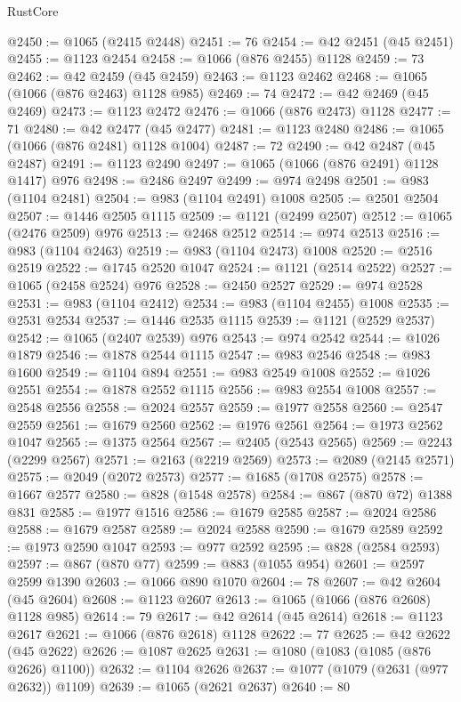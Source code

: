 \begin{lexlean}{RustCore}
\begin{coremodule}
@2450 := @1065 (@2415 @2448)
@2451 := 76
@2454 := @42 @2451 (@45 @2451)
@2455 := @1123 @2454
@2458 := @1066 (@876 @2455) @1128
@2459 := 73
@2462 := @42 @2459 (@45 @2459)
@2463 := @1123 @2462
@2468 := @1065 (@1066 (@876 @2463) @1128 @985)
@2469 := 74
@2472 := @42 @2469 (@45 @2469)
@2473 := @1123 @2472
@2476 := @1066 (@876 @2473) @1128
@2477 := 71
@2480 := @42 @2477 (@45 @2477)
@2481 := @1123 @2480
@2486 := @1065 (@1066 (@876 @2481) @1128 @1004)
@2487 := 72
@2490 := @42 @2487 (@45 @2487)
@2491 := @1123 @2490
@2497 := @1065 (@1066 (@876 @2491) @1128 @1417) @976
@2498 := @2486 @2497
@2499 := @974 @2498
@2501 := @983 (@1104 @2481)
@2504 := @983 (@1104 @2491) @1008
@2505 := @2501 @2504
@2507 := @1446 @2505 @1115
@2509 := @1121 (@2499 @2507)
@2512 := @1065 (@2476 @2509) @976
@2513 := @2468 @2512
@2514 := @974 @2513
@2516 := @983 (@1104 @2463)
@2519 := @983 (@1104 @2473) @1008
@2520 := @2516 @2519
@2522 := @1745 @2520 @1047
@2524 := @1121 (@2514 @2522)
@2527 := @1065 (@2458 @2524) @976
@2528 := @2450 @2527
@2529 := @974 @2528
@2531 := @983 (@1104 @2412)
@2534 := @983 (@1104 @2455) @1008
@2535 := @2531 @2534
@2537 := @1446 @2535 @1115
@2539 := @1121 (@2529 @2537)
@2542 := @1065 (@2407 @2539) @976
@2543 := @974 @2542
@2544 := @1026 @1879
@2546 := @1878 @2544 @1115
@2547 := @983 @2546
@2548 := @983 @1600
@2549 := @1104 @894
@2551 := @983 @2549 @1008
@2552 := @1026 @2551
@2554 := @1878 @2552 @1115
@2556 := @983 @2554 @1008
@2557 := @2548 @2556
@2558 := @2024 @2557
@2559 := @1977 @2558
@2560 := @2547 @2559
@2561 := @1679 @2560
@2562 := @1976 @2561
@2564 := @1973 @2562 @1047
@2565 := @1375 @2564
@2567 := @2405 (@2543 @2565)
@2569 := @2243 (@2299 @2567)
@2571 := @2163 (@2219 @2569)
@2573 := @2089 (@2145 @2571)
@2575 := @2049 (@2072 @2573)
@2577 := @1685 (@1708 @2575)
@2578 := @1667 @2577
@2580 := @828 (@1548 @2578)
@2584 := @867 (@870 @72) @1388 @831
@2585 := @1977 @1516
@2586 := @1679 @2585
@2587 := @2024 @2586
@2588 := @1679 @2587
@2589 := @2024 @2588
@2590 := @1679 @2589
@2592 := @1973 @2590 @1047
@2593 := @977 @2592
@2595 := @828 (@2584 @2593)
@2597 := @867 (@870 @77)
@2599 := @883 (@1055 @954)
@2601 := @2597 @2599 @1390
@2603 := @1066 @890 @1070
@2604 := 78
@2607 := @42 @2604 (@45 @2604)
@2608 := @1123 @2607
@2613 := @1065 (@1066 (@876 @2608) @1128 @985)
@2614 := 79
@2617 := @42 @2614 (@45 @2614)
@2618 := @1123 @2617
@2621 := @1066 (@876 @2618) @1128
@2622 := 77
@2625 := @42 @2622 (@45 @2622)
@2626 := @1087 @2625
@2631 := @1080 (@1083 (@1085 (@876 @2626) @1100))
@2632 := @1104 @2626
@2637 := @1077 (@1079 (@2631 (@977 @2632)) @1109)
@2639 := @1065 (@2621 @2637)
@2640 := 80

\end{coremodule}
\end{lexlean}
